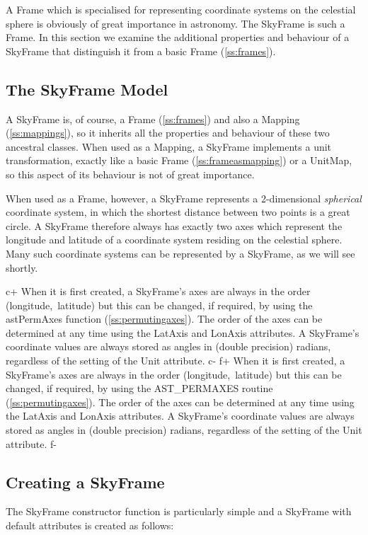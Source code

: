 \documentclass[twoside,11pt]{article}
\newcommand{\secref}[1]{\S\ref{#1}}
\renewcommand{\secref}[1]{\ref{#1}}
\begin{document}
A Frame which is specialised for representing coordinate systems on
the celestial sphere is obviously of great importance in
astronomy. The SkyFrame is such a Frame. In this section we examine
the additional properties and behaviour of a SkyFrame that distinguish
it from a basic Frame (\secref{ss:frames}).

\subsection{The SkyFrame Model}

A SkyFrame is, of course, a Frame (\secref{ss:frames}) and also a
Mapping (\secref{ss:mappings}), so it inherits all the properties and
behaviour of these two ancestral classes.  When used as a Mapping, a
SkyFrame implements a unit transformation, exactly like a basic Frame
(\secref{ss:frameasmapping}) or a UnitMap, so this aspect of its
behaviour is not of great importance.

When used as a Frame, however, a SkyFrame represents a 2-dimensional
{\em{spherical}} coordinate system, in which the shortest distance
between two points is a great circle.  A SkyFrame therefore always has
exactly two axes which represent the longitude and latitude of a
coordinate system residing on the celestial sphere. Many such
coordinate systems can be represented by a SkyFrame, as we will see
shortly.

c+
When it is first created, a SkyFrame's axes are always in the order
(longitude,~latitude) but this can be changed, if required, by using the
astPermAxes function (\secref{ss:permutingaxes}). The order of the axes
can be determined at any time using the LatAxis and LonAxis attributes. A
SkyFrame's coordinate values are always stored as angles in (double
precision) radians, regardless of the setting of the Unit attribute.
c-
f+
When it is first created, a SkyFrame's axes are always in the order
(longitude,~latitude) but this can be changed, if required, by using the
AST\_PERMAXES routine (\secref{ss:permutingaxes}). The order of the axes
can be determined at any time using the LatAxis and LonAxis attributes. A
SkyFrame's coordinate values are always stored as angles in (double
precision) radians, regardless of the setting of the Unit attribute.
f-

\subsection{Creating a SkyFrame}

The SkyFrame constructor function is particularly simple and a
SkyFrame with default attributes is created as follows:
\end{document}
